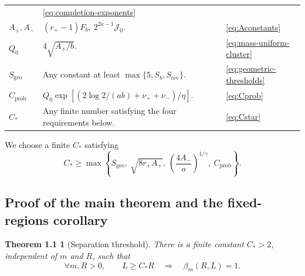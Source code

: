 \documentclass[11pt]{amsart}
\numberwithin{equation}{section}
\newtheorem*{mainrestatement}{Theorem 1.1}
\theoremstyle{definition}
\begin{document}
{\begin{longtable}{@{}p{}p{}p{}@{}}
 & \eqref{eq:completion-exponents}\\
\(A_+,A_-\)
 & \((r_+-1)F_b,\ 2^{2a-1}\mathcal J_0\).
 & \eqref{eq:Aconstants}\\
\(Q_0\)
 & \(4\sqrt{A_+/b}\).
 & \eqref{eq:mass-uniform-cluster}\\
\(S_{\mathrm{geo}}\)
 & Any constant at least \(\max\{5,S_b,S_{\mathrm{rev}}\}\).
 & \eqref{eq:geometric-thresholds}\\
\(C_{\mathrm{prob}}\)
 & \(Q_0\exp[(2\log2/(ab)+\nu_++\nu_-)/\eta]\).
 & \eqref{eq:Cprob}\\
\(C_*\)
 & Any finite number satisfying the four requirements below.
 & \eqref{eq:Cstar}\\
\end{longtable}
}

We choose a finite \(C_*\) satisfying
\begin{equation}
 C_*\ge
 \max\left\{
 S_{\mathrm{geo}},\
 \sqrt{8r_+A_+},\
 \left(\frac{4A_-}{a}\right)^{1/\gamma},\
 C_{\mathrm{prob}}
 \right\}.
 \label{eq:Cstar}
\end{equation}

\subsection{Proof of the main theorem and the fixed-regions corollary}
\label{subsec:main-proof}

\begin{mainrestatement}[Separation threshold]
There is a finite constant \(C_*>2\), independent of \(m\) and \(R\),
such that
\[
 \forall m,R>0,\qquad
 L\ge C_*R\quad\Longrightarrow\quad \beta_m(R,L)=1.
\]
\end{mainrestatement}
\end{document}

